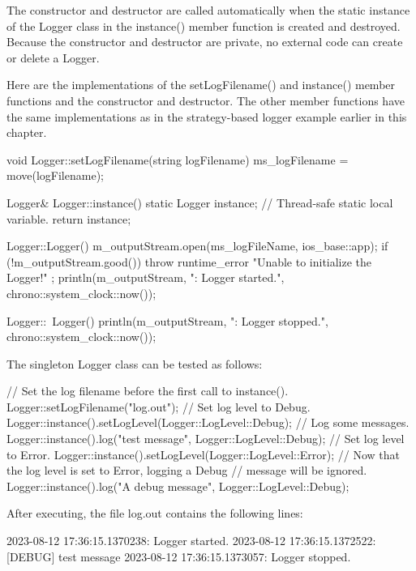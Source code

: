 The constructor and destructor are called automatically when the static instance of the Logger class in the instance() member function is created and destroyed. Because the constructor and destructor are private, no external code can create or delete a Logger.

Here are the implementations of the setLogFilename() and instance() member functions and the constructor and destructor. The other member functions have the same implementations as in the strategy-based logger example earlier in this chapter.

\begin{cpp}
void Logger::setLogFilename(string logFilename)
{ ms_logFilename = move(logFilename); }

Logger& Logger::instance()
{
    static Logger instance; // Thread-safe static local variable.
    return instance;
}

Logger::Logger()
{
    m_outputStream.open(ms_logFileName, ios_base::app);
    if (!m_outputStream.good()) {
        throw runtime_error { "Unable to initialize the Logger!" };
    }
    println(m_outputStream, "{}: Logger started.", chrono::system_clock::now());
}


Logger::~Logger()
{ println(m_outputStream, "{}: Logger stopped.", chrono::system_clock::now()); }
\end{cpp}


The singleton Logger class can be tested as follows:

\begin{cpp}
// Set the log filename before the first call to instance().
Logger::setLogFilename("log.out");
// Set log level to Debug.
Logger::instance().setLogLevel(Logger::LogLevel::Debug);
// Log some messages.
Logger::instance().log("test message", Logger::LogLevel::Debug);
// Set log level to Error.
Logger::instance().setLogLevel(Logger::LogLevel::Error);
// Now that the log level is set to Error, logging a Debug
// message will be ignored.
Logger::instance().log("A debug message", Logger::LogLevel::Debug);
\end{cpp}

After executing, the file log.out contains the following lines:

\begin{shell}
2023-08-12 17:36:15.1370238: Logger started.
2023-08-12 17:36:15.1372522: [DEBUG] test message
2023-08-12 17:36:15.1373057: Logger stopped.
\end{shell}





















